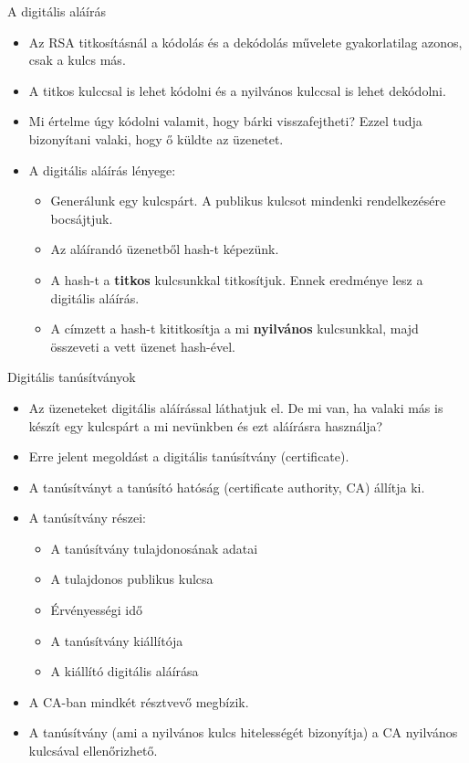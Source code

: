 \documentclass[12 pt]{beamer}
\begin{document}
\begin{frame}{A digitális aláírás}
  \begin{itemize}
    \item{Az RSA titkosításnál a kódolás és a dekódolás művelete gyakorlatilag azonos, csak a kulcs más.}
    \item{A titkos kulccsal is lehet kódolni és a nyilvános kulccsal is lehet dekódolni.}
    \item{Mi értelme úgy kódolni valamit, hogy bárki visszafejtheti? Ezzel tudja bizonyítani valaki, hogy ő küldte az üzenetet.}
    \item{A digitális aláírás lényege:}
      \begin{itemize}
        \item{Generálunk egy kulcspárt. A publikus kulcsot mindenki rendelkezésére bocsájtjuk.}
        \item{Az aláírandó üzenetből hash-t képezünk.}
        \item{A hash-t a \textbf{titkos} kulcsunkkal titkosítjuk. Ennek eredménye lesz a digitális aláírás.}
        \item{A címzett a hash-t kititkosítja a mi \textbf{nyilvános} kulcsunkkal, majd összeveti a vett üzenet hash-ével.}
      \end{itemize}
  \end{itemize}
\end{frame}

\begin{frame}{Digitális tanúsítványok}
  \begin{itemize}
    \item{Az üzeneteket digitális aláírással láthatjuk el. De mi van, ha valaki más is készít egy kulcspárt a mi nevünkben és ezt aláírásra használja?}
    \item{Erre jelent megoldást a digitális tanúsítvány (certificate).}
    \item{A tanúsítványt a tanúsító hatóság (certificate authority, CA) állítja ki.}
    \item{A tanúsítvány részei:}
      \begin{itemize}
        \item{A tanúsítvány tulajdonosának adatai}
        \item{A tulajdonos publikus kulcsa}
        \item{Érvényességi idő}
        \item{A tanúsítvány kiállítója}
        \item{A kiállító digitális aláírása}
      \end{itemize}
    \item{A CA-ban mindkét résztvevő megbízik.}
    \item{A tanúsítvány (ami a nyilvános kulcs hitelességét bizonyítja) a CA nyilvános kulcsával ellenőrizhető.}
  \end{itemize}
\end{frame}
\end{document}
